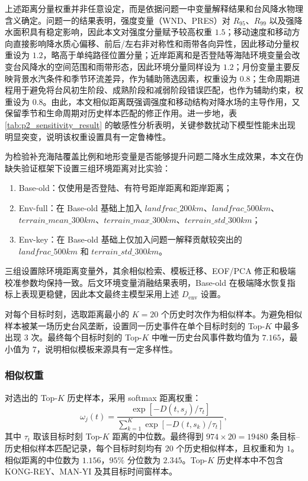 \documentclass[UTF8,a4paper,zihao=5,fontset=fandol]{ctexart}
\numberwithin{equation}{section}
\numberwithin{figure}{section}
\numberwithin{table}{section}
\begin{document}
上述距离分量权重并非任意设定，而是依据问题一中变量解释结果和台风降水物理含义确定。问题一的结果表明，强度变量（WND、PRES）对 $R_{95}$、$R_{99}$ 以及强降水面积具有稳定影响，因此本文对强度分量赋予较高权重 $1.5$；移动速度和移动方向直接影响降水质心偏移、前后/左右非对称性和雨带各向异性，因此移动分量权重设为 $1.2$，略高于单纯路径位置分量；近岸距离和是否登陆等海陆环境变量会改变台风降水的空间范围和雨带形态，因此环境分量同样设为 $1.2$；月份变量主要反映背景水汽条件和季节环流差异，作为辅助筛选因素，权重设为 $0.8$；生命周期进程用于避免将台风初生阶段、成熟阶段和减弱阶段错误匹配，也作为辅助约束，权重设为 $0.8$。由此，本文相似距离既强调强度和移动结构对降水场的主导作用，又保留季节和生命周期对历史样本匹配的修正作用。进一步地，表 \ref{tab:p2_sensitivity_result} 的敏感性分析表明，关键参数扰动下模型性能未出现明显突变，说明该权重设置具有一定鲁棒性。

为检验补充海陆覆盖比例和地形变量是否能够提升问题二降水生成效果，本文在伪缺失验证框架下设置三组环境距离对比实验：
\begin{enumerate}
    \item Base-old：仅使用是否登陆、有符号距岸距离和距岸距离；
    \item Env-full：在 Base-old 基础上加入 $landfrac\_200km$、$landfrac\_500km$、$terrain\_mean\_300km$、$terrain\_max\_300km$、$terrain\_std\_300km$；
    \item Env-key：在 Base-old 基础上仅加入问题一解释贡献较突出的 $landfrac\_500km$ 和 $terrain\_std\_300km$。
\end{enumerate}
三组设置除环境距离变量外，其余相似检索、模板迁移、EOF/PCA 修正和极端校准参数均保持一致。后文环境变量消融结果表明，Base-old 在极端降水恢复指标上表现更稳健，因此本文最终主模型采用上述 $D_{\mathrm{env}}$ 设置。

对每个目标时刻，选取距离最小的 $K=20$ 个历史时次作为相似样本。为避免相似样本被某一场历史台风垄断，设置同一历史事件在单个目标时刻的 Top-$K$ 中最多出现 $3$ 次。最终每个目标时刻的 Top-$K$ 中唯一历史台风事件数均值为 $7.165$，最小值为 $7$，说明相似模板来源具有一定多样性。

\subsubsection{相似权重}

对选出的 Top-$K$ 历史样本，采用 softmax 距离权重：
\begin{equation}
\omega_j(t)=
\frac{\exp[-D(t,s_j)/\tau_t]}
{\sum_{k=1}^{K}\exp[-D(t,s_k)/\tau_t]},
\end{equation}
其中 $\tau_t$ 取该目标时刻 Top-$K$ 距离的中位数。最终得到 $974\times 20=19480$ 条目标--历史相似样本匹配记录，每个目标时刻均有 $20$ 个历史相似样本，且权重和为 $1$。相似距离的中位数为 $1.156$，$95\%$ 分位数为 $2.345$。Top-$K$ 历史样本中不包含 KONG-REY、MAN-YI 及其目标时间窗样本。
\end{document}
